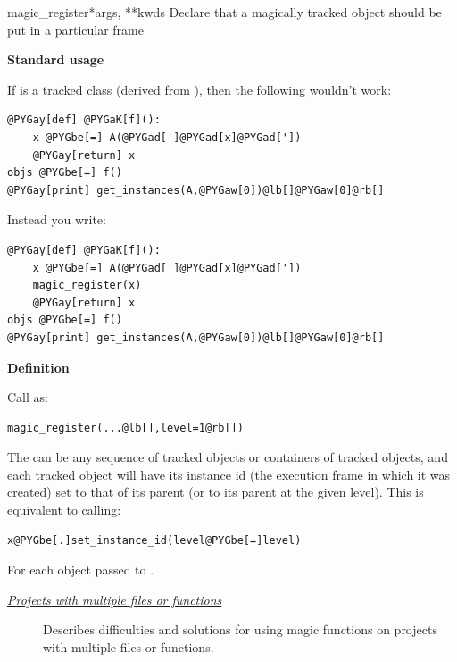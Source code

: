 \documentclass[letterpaper,10pt]{manual}
\begin{document}
\hypertarget{brian.magic_register}{}\begin{funcdesc}{magic\_register}{*args, **kwds}
Declare that a magically tracked object should be put in a particular frame

\textbf{Standard usage}

If  is a tracked class (derived from ), then the following wouldn't
work:

\begin{Verbatim}[commandchars=@\[\]]
@PYGay[def] @PYGaK[f]():
    x @PYGbe[=] A(@PYGad[']@PYGad[x]@PYGad['])
    @PYGay[return] x
objs @PYGbe[=] f()
@PYGay[print] get_instances(A,@PYGaw[0])@lb[]@PYGaw[0]@rb[]
\end{Verbatim}

Instead you write:

\begin{Verbatim}[commandchars=@\[\]]
@PYGay[def] @PYGaK[f]():
    x @PYGbe[=] A(@PYGad[']@PYGad[x]@PYGad['])
    magic_register(x)
    @PYGay[return] x    
objs @PYGbe[=] f()
@PYGay[print] get_instances(A,@PYGaw[0])@lb[]@PYGaw[0]@rb[]
\end{Verbatim}

\textbf{Definition}

Call as:

\begin{Verbatim}[commandchars=@\[\]]
magic_register(...@lb[],level=1@rb[])
\end{Verbatim}

The  can be any sequence of tracked objects or containers of tracked objects,
and each tracked object will have its instance id (the execution frame in which it was
created) set to that of its parent (or to its parent at the given level). This is
equivalent to calling:

\begin{Verbatim}[commandchars=@\[\]]
x@PYGbe[.]set_instance_id(level@PYGbe[=]level)
\end{Verbatim}

For each object  passed to \hyperlink{brian.magic_register}{}.
\end{funcdesc}


\begin{seealso}
\begin{description}
\item[\hyperlink{projects-with-multiple-files}{\emph{Projects with multiple files or functions}}]
Describes difficulties and solutions for using magic functions
on projects with multiple files or functions.

\end{description}

\end{seealso}
\end{document}
